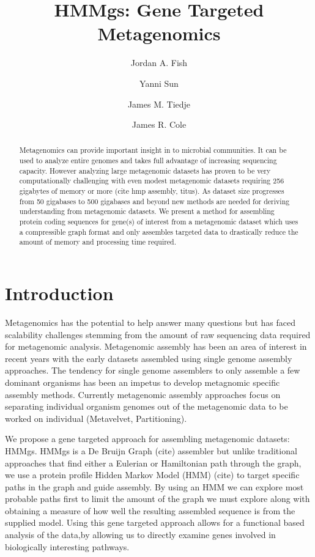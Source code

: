 \documentclass{article}
\begin{document}
\title{HMMgs: Gene Targeted Metagenomics}
\author{Jordan A. Fish \and Yanni Sun \and James M. Tiedje \and James R. Cole}
\maketitle
\begin{abstract}
Metagenomics can provide important insight in to microbial communities.  It can be used to analyze entire genomes and takes full advantage of increasing sequencing capacity. However analyzing large metagenomic datasets has proven to be very computationally challenging with even modest metagenomic datasets requiring 256 gigabytes of memory or more (cite hmp assembly, titus). As dataset size progresses from 50 gigabases to 500 gigabases and beyond new methods are needed for deriving understanding from metagenomic datasets.  We present a method for assembling protein coding sequences for gene(s) of interest from a metagenomic dataset which uses a compressible graph format and only assembles targeted data to drastically reduce the amount of memory and processing time required.
\end{abstract}
\section{Introduction}
Metagenomics has the potential to help answer many questions but has faced scalability challenges stemming from the amount of raw sequencing data required for metagenomic analysis.  Metagenomic assembly has been an area of interest in recent years with the early datasets assembled using single genome assembly approaches.  The tendency for single genome assemblers to only assemble a few dominant organisms has been an impetus to develop metagnomic specific assembly methods.  Currently metagenomic assembly approaches focus on separating individual organism genomes out of the metagenomic data to be worked on individual (Metavelvet, Partitioning).  

We propose a gene targeted approach for assembling metagenomic datasets: HMMgs.  HMMgs is a De Bruijn Graph (cite) assembler but unlike traditional approaches that find either a Eulerian or Hamiltonian path through the graph, we use a protein profile Hidden Markov Model (HMM) (cite) to target specific paths in the graph and guide assembly. By using an HMM we can explore most probable paths first to limit the amount of the graph we must explore along with obtaining a measure of how well the resulting assembled sequence is from the supplied model.  Using this gene targeted approach allows for a functional based analysis of the data,by allowing us to directly examine genes involved in biologically interesting pathways.
\end{document}
